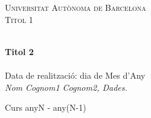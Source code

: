 \begin{titlepage}
\vbox{ }
\begin{center}

\textsc{\LARGE Universitat Autònoma de Barcelona}\\[1.5cm]
\textsc{\Large Titol 1}\\[0.5cm]
\vbox{ }

\HRule \\[0.4cm]
{\huge \bfseries Titol 2}\\[0.4cm]
\HRule \\[0.4cm]
{Data de realització: dia de Mes d'Any}\\[1.5cm]

\large
\emph{
Nom Cognom1 Cognom2, Dades. 
}\\

\vfill

{\large Curs anyN - any(N-1)}
\end{center}
\end{titlepage}
